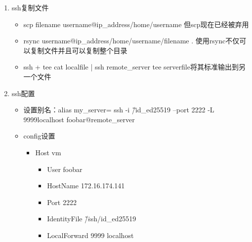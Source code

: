\documentclass[a4paper, 12pt]{article}
\begin{document}
\begin{enumerate}
\begin{itemize}
    \end{itemize}
  \item{\large ssh复制文件}
    \begin{itemize}
      \item scp filename username@ip\_address\:/home/username 但scp现在已经被弃用
      \item rsync username@ip\_address\:/home/username/filename . 使用rsync不仅可以复制文件并且可以复制整个目录
      \item ssh + tee cat localfile | ssh remote\_server tee serverfile将其标准输出到另一个文件
    \end{itemize}  
\item{\large ssh配置}
    \begin{itemize}
      \item 设置别名：alias my\_server= ssh -i \~/\.id\_ed25519 --port 2222 -L 9999\:localhost foobar@remote\_server
      \item config设置
      \begin{itemize}
         \item 
         Host vm \\
            \begin{itemize}
            \item{ } User foobar \\ 
            \item{ } HostName 172.16.174.141 \\ 
            \item{ } Port 2222 \\ 
            \item{ } IdentityFile \~/\.ssh/id\_ed25519 \\ 
            \item{ } LocalForward 9999 localhost  \\ 
            \end{itemize}
      \end{itemize}
    \end{itemize}  
\end{enumerate}
\end{document}
